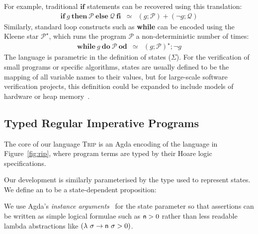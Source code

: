 \documentclass[sigplan]{acmart}%
\begin{document}
For example, traditional $\textbf{if}$ statements can be recovered using this translation:
$$
\begin{array}{lcl}
\textbf{if}\ g\ \textbf{then}\ \mathcal{P}\ \textbf{else}\ \mathcal{Q}\ \textbf{fi} & \simeq & (g;\mathcal{P}) + (\neg g; \mathcal{Q}) 
\end{array}
$$
Similarly, standard loop constructs such as \textbf{while} can be encoded using the Kleene star $\mathcal{P}^\star$, which runs the program $\mathcal{P}$ a non-deterministic
number of times:
$$
\begin{array}{lcl}
\textbf{while}\ g\ \textbf{do}\ \mathcal{P}\ \textbf{od} & \simeq & (g; \mathcal{P})^\star; \neg g
\end{array}
$$
The language is parametric in the definition of states ($\Sigma$). For the verification of small programs or
specific algorithms, states are usually defined to be the mapping of all variable names to their values, but 
for large-scale software verification projects, this definition could be expanded to include models of hardware 
or heap memory~\citep{cmem}.

\subsection{Typed Regular Imperative Programs}\label{subsec:trip}

The core of our language \textsc{Trip} is an Agda encoding of the language in Figure~\ref{fig:rip}, where
program terms are typed by their Hoare logic specifications.

Our development is similarly parameterised by the type used to represent states. We define an
 to be a state-dependent proposition:
\begin{code}
\>[2]\AgdaSpace{}%
\AgdaSymbol{=}\AgdaSpace{}%
\AgdaSpace{}%
\AgdaSpace{}%
\AgdaSymbol{:}\AgdaSpace{}%
\AgdaSpace{}%
\AgdaSpace{}%
\AgdaSpace{}%
\<%
\end{code}
We use Agda's \emph{instance arguments}~\citep{instanceargs} for the state parameter
so that assertions can be written as simple logical formulae such as $\AgdaField{n} > 0$ rather than 
less readable lambda abstractions like $(\lambda\ \sigma \rightarrow \AgdaField{n}\ \sigma > 0)$.
\end{document}
